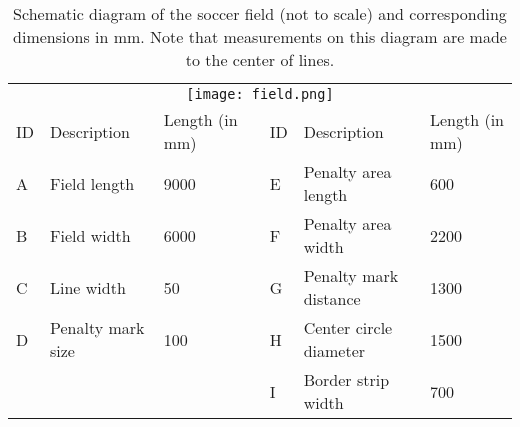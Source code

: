 \begin{table}[h]
\begin{adjustbox}{max width=\textwidth}
\begin{tabular}{lllllll}
\multicolumn{7}{c}{\texttt{[image: field.png]}}\\
\multicolumn{1}{|l|}{ID} & \multicolumn{1}{l|}{Description}       & \multicolumn{1}{l|}{Length (in mm)} & \multicolumn{1}{l|}{} & \multicolumn{1}{l|}{ID} & \multicolumn{1}{l|}{Description}            & \multicolumn{1}{l|}{Length (in mm)} \\ \cline{1-3} \cline{5-7} 
\multicolumn{1}{|l|}{A}  & \multicolumn{1}{l|}{Field length}      & \multicolumn{1}{l|}{9000}           & \multicolumn{1}{l|}{} & \multicolumn{1}{l|}{E}  & \multicolumn{1}{l|}{Penalty area length}    & \multicolumn{1}{l|}{600}            \\ \cline{1-3} \cline{5-7} 
\multicolumn{1}{|l|}{B}  & \multicolumn{1}{l|}{Field width}       & \multicolumn{1}{l|}{6000}           & \multicolumn{1}{l|}{} & \multicolumn{1}{l|}{F}  & \multicolumn{1}{l|}{Penalty area width}     & \multicolumn{1}{l|}{2200}           \\ \cline{1-3} \cline{5-7} 
\multicolumn{1}{|l|}{C}  & \multicolumn{1}{l|}{Line width}        & \multicolumn{1}{l|}{50}             & \multicolumn{1}{l|}{} & \multicolumn{1}{l|}{G}  & \multicolumn{1}{l|}{Penalty mark distance}  & \multicolumn{1}{l|}{1300}           \\ \cline{1-3} \cline{5-7} 
\multicolumn{1}{|l|}{D}  & \multicolumn{1}{l|}{Penalty mark size} & \multicolumn{1}{l|}{100}            & \multicolumn{1}{l|}{} & \multicolumn{1}{l|}{H}  & \multicolumn{1}{l|}{Center circle diameter} & \multicolumn{1}{l|}{1500}           \\ \cline{1-3} \cline{5-7} 
\multicolumn{1}{|l|}{}   & \multicolumn{1}{l|}{}                  & \multicolumn{1}{l|}{}               & \multicolumn{1}{l|}{} & \multicolumn{1}{l|}{I}  & \multicolumn{1}{l|}{Border strip width}     & \multicolumn{1}{l|}{700}           
\end{tabular}
\end{adjustbox}
\caption[Schematic diagram of the soccer field]{Schematic diagram of the soccer field (not to scale) and corresponding dimensions in
  mm. Note that measurements on this diagram are made to the center of lines. \cite{Committee2013}}
\label{tab:field}
\end{table}
